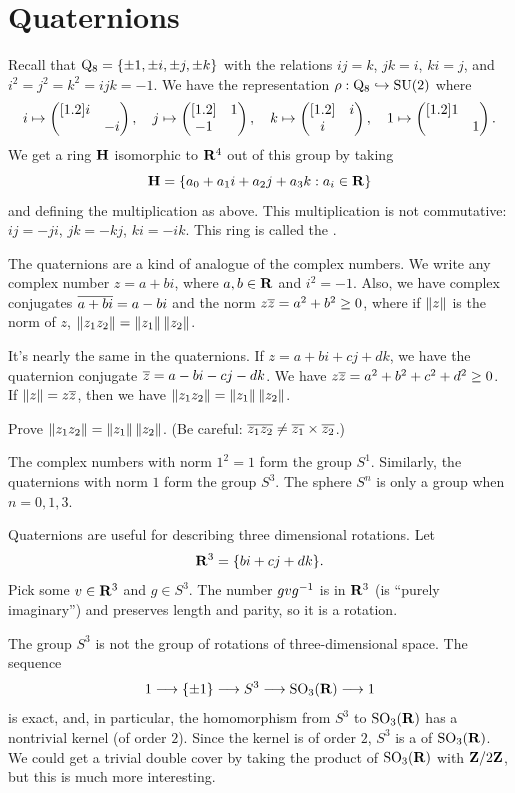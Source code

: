 \documentclass[11pt, oneside]{amsart}
\begin{document}
\section{Quaternions}
Recall that $\operatorname{Q_8} = \{ \pm1,\pm i,\pm  j,\pm k\}$ with the relations $ij = k$, $jk=i$, $ki=j$, and $i^2 = j^2 = k^2 = ijk =-1$. We have the representation $\rho : \operatorname{Q_8} \hookrightarrow \operatorname{SU}(2)$ where
\begin{align*}
i \mapsto \begin{pmatrix} [ 1.2 ] i &\\ & -i\end{pmatrix},\quad  j \mapsto \begin{pmatrix} [ 1.2 ]  & 1 \\ -1&\end{pmatrix},\quad k \mapsto \begin{pmatrix} [ 1.2 ] & i \\i&\end{pmatrix},\quad  1\mapsto \begin{pmatrix} [ 1.2 ] 1 & \\ & 1\end{pmatrix}.
\end{align*}
We get a ring $\mathbf H$ isomorphic to $\mathbf R^4$ out of this group by taking
$$
\mathbf H = \{a_0 + a_1 i + a_2j +a_3 k : a_i\in \mathbf R\}
$$
and defining the multiplication as above. This multiplication is not commutative: $ij=-ji$, $jk= -kj$, $ki = -ik$. This ring is called the . 

The quaternions are a kind of analogue of the complex numbers. We write any complex number $z = a + bi$, where $a,b\in \mathbf R$ and $i^2 = -1$. Also, we have complex conjugates $\overline{a+bi} = a-bi$ and the norm $z\overline z = a^2 + b^2\ge 0$, where if $\left \lVert z \right \rVert$ is the norm of $z$, $\left \lVert z_1z_2 \right \rVert = \left \lVert z_1 \right \rVert \left \lVert z_2 \right \rVert$. 

It's nearly the same in the quaternions. If $z= a + bi + cj +dk$, we have the quaternion conjugate $\overline z = a - bi - cj - dk$. We have $z\overline z = a^2 + b^2 +c^2 + d^2 \ge 0$. If $\left \lVert z \right \rVert = z\overline z$, then we have $\left \lVert z_1z_2 \right \rVert = \left \lVert z_1 \right \rVert\left \lVert z_2 \right \rVert$.
\begin{exercise}
Prove $\left \lVert z_1z_2 \right \rVert = \left \lVert z_1 \right \rVert\left \lVert z_2 \right \rVert$. (Be careful: $\overline {z_1z_2} \neq \overline{ z_1}\times\overline{z_2}$.)
\end{exercise}

The complex numbers with norm $1^2 = 1$ form the group $S^1$. Similarly, the quaternions with norm $1$ form the group $S^3$. The sphere $S^n$ is only a group when $n = 0,1,3$.

Quaternions are useful for describing three dimensional rotations. Let 
$$
\mathbf R^3 = \{b i + cj + dk\}.
$$
Pick some $v\in \mathbf R^3$ and $g\in S^3$. The number $gvg^{-1}$ is in $\mathbf R^3$ (is ``purely imaginary'') and preserves length and parity, so it is a rotation. 

The group $S^3$ is not the group of rotations of three-dimensional space. The sequence 
$$
1\longrightarrow\{\pm1\} \longrightarrow S^3 \longrightarrow \operatorname{SO}_3(\mathbf R)\longrightarrow 1
$$
is exact, and, in particular, the homomorphism from $S^3 $ to $\operatorname{SO}_3(\mathbf R)$ has a nontrivial kernel (of order $2$). Since the kernel is of order $2$, $S^3$ is a  of $\operatorname{SO}_3(\mathbf R)$. We could get a trivial double cover by taking the product of $\operatorname{SO}_3(\mathbf R)$ with $\mathbf Z/2\mathbf Z$, but this is much more interesting.
\end{document}
